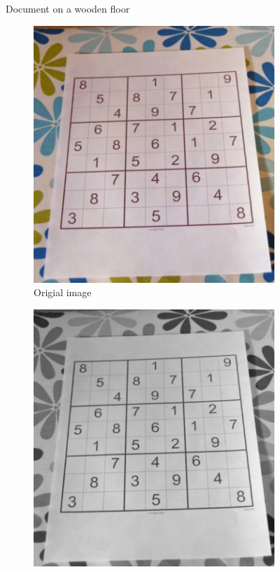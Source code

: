\documentclass{scrartcl}
\begin{document}
\begin{figure}[!htbp]
    \caption{Document on a wooden floor}
    \label{figure:doc-on-wooden-floor}
  \end{figure}

  \begin{figure}[!htbp]
    \centering
    \begin{subfigure}[b]{0.3\textwidth}
      \centering
      \includegraphics[width=\textwidth]{pictures/results/sudoku/original.png}
      \caption{Origial image}
    \end{subfigure}
    \begin{subfigure}[b]{0.3\textwidth}
      \centering
      \includegraphics[width=\textwidth]{pictures/results/sudoku/grayscale.png}

\end{subfigure}
\end{figure}
\end{document}
